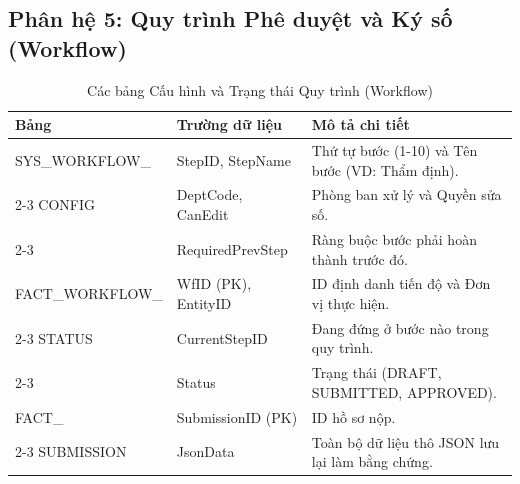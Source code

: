 \documentclass[12pt,a4paper]{article}
\begin{document}
\subsection{Phân hệ 5: Quy trình Phê duyệt và Ký số (Workflow)}

\begin{table}[h!]
    \centering
    \caption{Các bảng Cấu hình và Trạng thái Quy trình (Workflow)}
    \begin{tabularx}{\textwidth}{|l|l|X|}
        \hline
        \textbf{Bảng} & \textbf{Trường dữ liệu} & \textbf{Mô tả chi tiết} \\ \hline
        SYS\_WORKFLOW\_ & StepID, StepName & Thứ tự bước (1-10) và Tên bước (VD: Thẩm định). \\ \cline{2-3}
        CONFIG        & DeptCode, CanEdit& Phòng ban xử lý và Quyền sửa số. \\ \cline{2-3}
                      & RequiredPrevStep & Ràng buộc bước phải hoàn thành trước đó. \\ \hline
        FACT\_WORKFLOW\_& WfID (PK), EntityID& ID định danh tiến độ và Đơn vị thực hiện. \\ \cline{2-3}
        STATUS        & CurrentStepID & Đang đứng ở bước nào trong quy trình. \\ \cline{2-3}
                      & Status & Trạng thái (DRAFT, SUBMITTED, APPROVED). \\ \hline
        FACT\_        & SubmissionID (PK)& ID hồ sơ nộp. \\ \cline{2-3}
        SUBMISSION    & JsonData & Toàn bộ dữ liệu thô JSON lưu lại làm bằng chứng. \\ \hline
    \end{tabularx}
\end{table}
\end{document}
